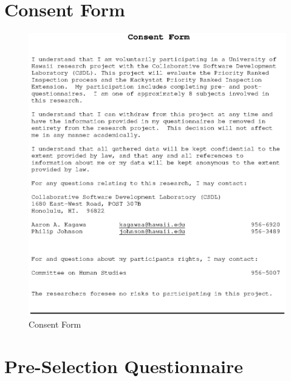 
\appendix

\chapter{Consent Form}
\label{appendix:consent}
\begin{figure}[!htbp]
  \centering
  \includegraphics[width=1.0\textwidth]{figs/ConsentForm_shrunk.eps}
  \caption{Consent Form}
  \label{fig:consent}
\end{figure}

\chapter{Pre-Selection Questionnaire}
\label{appendix:pre-selection-questionnaire}

